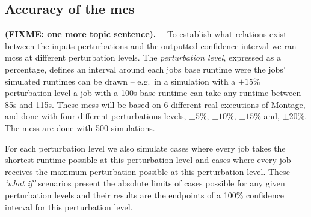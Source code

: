 \documentclass[10pt,conference,compsocconf]{IEEEtran}
\newcommand{\pmpc}[1]{$\pm#1\%$}
\begin{document}

%



\subsection{Accuracy of the \acl{mcs}}

\textbf{(FIXME: one more topic sentence).}~~
To establish what relations exist between the inputs perturbations and the
outputted confidence interval we ran \acp{mcs} at different perturbation levels.
The \emph{perturbation level}, expressed as a percentage, defines an interval
around each jobs base runtime were the jobs' simulated runtimes can be drawn -- 
e.g.~in a simulation with a \pmpc{15} perturbation level a job with a 100s base
runtime can take any runtime between 85s and 115s. These \acp{mcs} will be based
on 6 different real executions of Montage\cite{montage2009}, and done with four
different perturbations levels, \pmpc{5}, \pmpc{10}, \pmpc{15} and, \pmpc{20}.
The \acp{mcs} are done with 500 simulations. 

For each perturbation level we also simulate cases where every job takes the
shortest runtime possible at this perturbation level and cases where every job
receives the maximum perturbation possible at this perturbation level. These
\emph{`what if'} scenarios present the absolute limits of cases possible for any
given perturbation levels and their results are the endpoints of a 100\%
confidence interval for this perturbation level.
\end{document}

